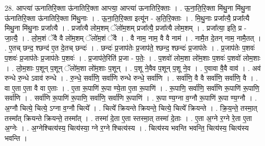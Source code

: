 \documentclass[17pt]{extarticle}
\begin{document}
28. आप्त्या॑ ऊनातिरि॒क्ता ऊ॑नातिरि॒क्ता आप्त्या॒ आप्त्या॑ ऊनातिरि॒क्ताः । . ऊ॒ना॒ति॒रि॒क्ता मि॑थु॒ना मि॑थु॒ना ऊ॑नातिरि॒क्ता ऊ॑नातिरि॒क्ता मि॑थु॒नाः । . ऊ॒ना॒ति॒रि॒क्ता इत्यू॑न - अ॒ति॒रि॒क्ताः । . मि॒थु॒नाः प्रजा᳚त्यै॒ प्रजा᳚त्यै मिथु॒ना मि॑थु॒नाः प्रजा᳚त्यै । . प्रजा᳚त्यै लोम॒शम् ॅलो॑म॒शम् प्रजा᳚त्यै॒ प्रजा᳚त्यै लोम॒शम् । . प्रजा᳚त्या॒ इति॒ प्र - जा॒त्यै॒ । . लो॒म॒शं ॅवै वै लो॑म॒शम् ॅलो॑म॒शं ॅवै । . वै नाम॒ नाम॒ वै वै नाम॑ । . नामै॒त दे॒तन् नाम॒ नामै॒तत् । . ए॒तच् छन्द॒ श्छन्द॑ ए॒त दे॒तच् छन्दः॑ । . छन्दः॑ प्र॒जाप॑तेः प्र॒जाप॑ते॒ श्छन्द॒ श्छन्दः॑ प्र॒जाप॑तेः । . प्र॒जाप॑तेः प॒शवः॑ प॒शवः॑ प्र॒जाप॑तेः प्र॒जाप॑तेः प॒शवः॑ । . प्र॒जाप॑ते॒रिति॑ प्र॒जा - प॒तेः॒ । . प॒शवो॑ लोम॒शा लो॑म॒शाः प॒शवः॑ प॒शवो॑ लोम॒शाः । . लो॒म॒शाः प॒शून् प॒शून् ॅलो॑म॒शा लो॑म॒शाः प॒शून् । . प॒शू ने॒वैव प॒शून् प॒शू ने॒व । . ए॒वावा वै॒वै वाव॑ । . अव॑ रुन्धे रु॒न्धे ऽवाव॑ रुन्धे । . रु॒न्धे॒ सर्वा॑णि॒ सर्वा॑णि रुन्धे रुन्धे॒ सर्वा॑णि । . सर्वा॑णि॒ वै वै सर्वा॑णि॒ सर्वा॑णि॒ वै । . वा ए॒ता ए॒ता वै वा ए॒ताः । . ए॒ता रू॒पाणि॑ रू॒पा ण्ये॒ता ए॒ता रू॒पाणि॑ । . रू॒पाणि॒ सर्वा॑णि॒ सर्वा॑णि रू॒पाणि॑ रू॒पाणि॒ सर्वा॑णि । . सर्वा॑णि रू॒पाणि॑ रू॒पाणि॒ सर्वा॑णि॒ सर्वा॑णि रू॒पाणि॑ । . रू॒पा ण्य॒ग्ना व॒ग्नौ रू॒पाणि॑ रू॒पा ण्य॒ग्नौ । . अ॒ग्नौ चित्ये॒ चित्ये॒ ऽग्ना व॒ग्नौ चित्ये᳚ । . चित्ये᳚ क्रियन्ते क्रियन्ते॒ चित्ये॒ चित्ये᳚ क्रियन्ते । . क्रि॒य॒न्ते॒ तस्मा॒त् तस्मा᳚त् क्रियन्ते क्रियन्ते॒ तस्मा᳚त् । . तस्मा॑ दे॒ता ए॒ता स्तस्मा॒त् तस्मा॑ दे॒ताः । . ए॒ता अ॒ग्ने र॒ग्ने रे॒ता ए॒ता अ॒ग्नेः । . अ॒ग्नेश्चित्य॑स्य॒ चित्य॑स्या॒ ग्ने र॒ग्ने श्चित्य॑स्य । . चित्य॑स्य भवन्ति भवन्ति॒ चित्य॑स्य॒ चित्य॑स्य भवन्ति । \newline
\end{document}
